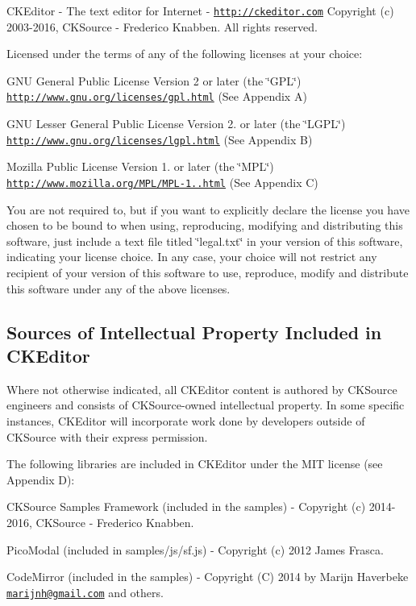 C\+K\+Editor -\/ The text editor for Internet -\/ \href{http://ckeditor.com}{\tt http\+://ckeditor.\+com} Copyright (c) 2003-\/2016, C\+K\+Source -\/ Frederico Knabben. All rights reserved.

Licensed under the terms of any of the following licenses at your choice\+:


\begin{DoxyItemize}
\item G\+NU General Public License Version 2 or later (the \char`\"{}\+G\+P\+L\char`\"{}) \href{http://www.gnu.org/licenses/gpl.html}{\tt http\+://www.\+gnu.\+org/licenses/gpl.\+html} (See Appendix A)
\item G\+NU Lesser General Public License Version 2. or later (the \char`\"{}\+L\+G\+P\+L\char`\"{}) \href{http://www.gnu.org/licenses/lgpl.html}{\tt http\+://www.\+gnu.\+org/licenses/lgpl.\+html} (See Appendix B)
\item Mozilla Public License Version 1. or later (the \char`\"{}\+M\+P\+L\char`\"{}) \href{http://www.mozilla.org/MPL/MPL-1.1.html}{\tt http\+://www.\+mozilla.\+org/\+M\+P\+L/\+M\+P\+L-\/1..\+html} (See Appendix C)
\end{DoxyItemize}

You are not required to, but if you want to explicitly declare the license you have chosen to be bound to when using, reproducing, modifying and distributing this software, just include a text file titled \char`\"{}legal.\+txt\char`\"{} in your version of this software, indicating your license choice. In any case, your choice will not restrict any recipient of your version of this software to use, reproduce, modify and distribute this software under any of the above licenses.

\subsection*{Sources of Intellectual Property Included in C\+K\+Editor }

Where not otherwise indicated, all C\+K\+Editor content is authored by C\+K\+Source engineers and consists of C\+K\+Source-\/owned intellectual property. In some specific instances, C\+K\+Editor will incorporate work done by developers outside of C\+K\+Source with their express permission.

The following libraries are included in C\+K\+Editor under the M\+IT license (see Appendix D)\+:


\begin{DoxyItemize}
\item C\+K\+Source Samples Framework (included in the samples) -\/ Copyright (c) 2014-\/2016, C\+K\+Source -\/ Frederico Knabben.
\item Pico\+Modal (included in {\ttfamily samples/js/sf.\+js}) -\/ Copyright (c) 2012 James Frasca.
\item Code\+Mirror (included in the samples) -\/ Copyright (C) 2014 by Marijn Haverbeke \href{mailto:marijnh@gmail.com}{\tt marijnh@gmail.\+com} and others.
\end{DoxyItemize}

